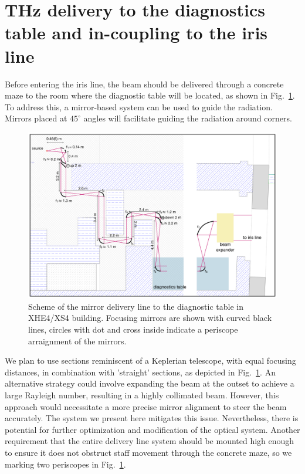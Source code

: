 \section{THz delivery to the diagnostics table and in-coupling to the iris line}

    Before entering the iris line, the beam should be delivered through a concrete maze to the room where the diagnostic table will be located, as shown in Fig.~\ref{Fig:mirrors_outline}. To address this, a mirror-based system can be used to guide the radiation. Mirrors placed at $45^\circ$ angles will facilitate guiding the radiation around corners.
    
    \begin{figure}[h!]
    	\centering
    		\includegraphics[trim={0 0cm 0 0cm}, width=0.99\linewidth]{content/images/transport/mirrors_outline.pdf}
    		\centering
            \captionsetup{justification=centering}
        	\caption{Scheme of the mirror delivery line to the diagnostic table in XHE4/XS4 building. Focusing mirrors are shown with curved black lines, circles with dot and cross inside indicate a periscope arraignment of the mirrors.}
        \label{Fig:mirrors_outline}
    \end{figure}
    
    We plan to use sections reminiscent of a Keplerian telescope, with equal focusing distances, in combination with 'straight' sections, as depicted in Fig.~\ref{Fig:mirrors_outline}. An alternative strategy could involve expanding the beam at the outset to achieve a large Rayleigh number, resulting in a highly collimated beam. However, this approach would necessitate a more precise mirror alignment to steer the beam accurately. The system we present here mitigates this issue. Nevertheless, there is potential for further optimization and modification of the optical system. Another requirement that the entire delivery line system should be mounted high enough to ensure it does not obstruct staff movement through the concrete maze, so we marking two periscopes in Fig.~\ref{Fig:mirrors_outline}.

